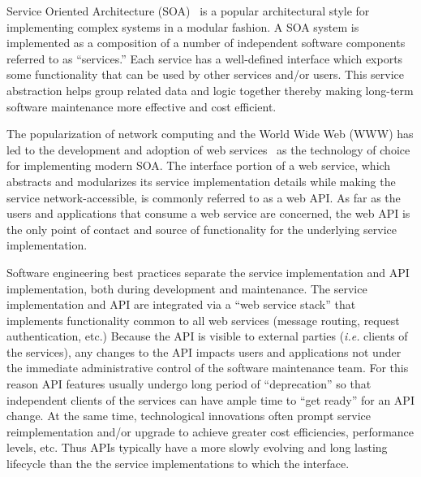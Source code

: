 
Service Oriented Architecture (SOA)~\cite{XXX} is a popular architectural style for
implementing complex systems in a modular fashion. A SOA system
is implemented as a composition of a number of independent software components
referred to as ``services.'' Each service has a well-defined interface which
exports some functionality that can be used by other services and/or users.
This service abstraction helps group related data and logic together thereby
making long-term software maintenance more effective and cost efficient. 


The popularization of network computing and the World Wide Web (WWW) 
has led to the development and adoption of web services~\cite{XXXW3CXXX} as
the technology of choice for implementing modern SOA.
The
interface portion of a web service, which abstracts and modularizes
its service implementation
details while making the service network-accessible, is commonly referred to
as a web API. As far as the users and applications that consume a web service
are concerned, the web API is the only point of contact and source of
functionality for the underlying service implementation.

Software engineering best practices separate the service implementation
and API implementation, both during development and maintenance.
The service implementation and API are integrated via 
a ``web service stack'' that implements functionality common to all web
services (message routing, request authentication, etc.)
Because the API is visible to external parties ({\em i.e.} clients of the
services), any changes to the API
impacts users and applications not under the immediate administrative control
of the software maintenance team.  For this reason API features 
usually undergo long
period of ``deprecation'' so that independent clients of the services can have
ample time to ``get ready'' for an API change.  At the same time,
technological innovations often prompt service reimplementation and/or 
upgrade to
achieve greater cost efficiencies, performance levels, etc.
Thus APIs typically have a more
slowly evolving and long lasting lifecycle than the the service
implementations
to which the interface. 

